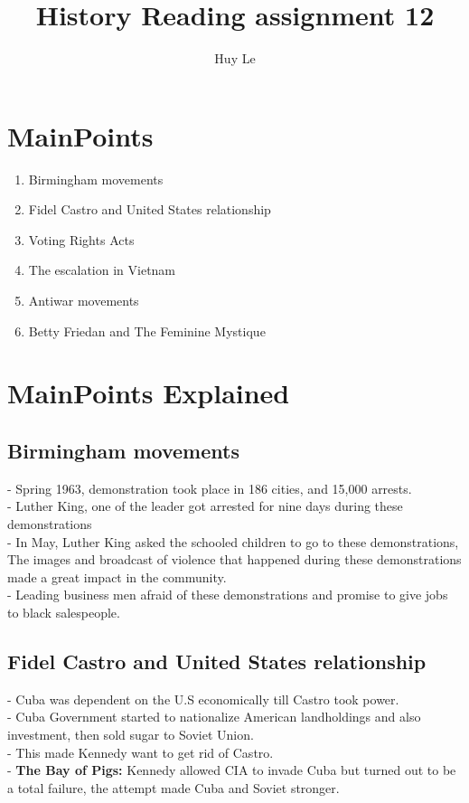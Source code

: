 \documentclass{article}
\begin{document}
\title{History Reading assignment 12}
\author{Huy Le}
\maketitle
\section{ MainPoints}
\begin{enumerate}
\item Birmingham movements
\item Fidel Castro and United States relationship
\item Voting Rights Acts
\item The escalation in Vietnam
\item Antiwar movements
\item Betty Friedan and The Feminine Mystique
\end{enumerate}
\section{MainPoints Explained}
\subsection{ Birmingham movements}
- Spring 1963, demonstration took place in 186 cities, and 15,000 arrests.\\
- Luther King, one of the leader got arrested for nine days during these demonstrations\\
- In May, Luther King asked the schooled children to go to these demonstrations, The images and broadcast of violence that happened during these
demonstrations made a great impact in the community.\\
- Leading business men afraid of these demonstrations and promise to give jobs to black salespeople.

\subsection{Fidel Castro and United States relationship}
- Cuba was dependent on the U.S economically till Castro took power.\\
- Cuba Government started to nationalize American landholdings and also investment, then sold sugar to Soviet Union.\\
- This made Kennedy want to get rid of Castro. \\
- \textbf{The Bay of Pigs:} Kennedy allowed CIA to invade Cuba but turned out to be a total failure, the attempt made Cuba and Soviet stronger.
\end{document}
